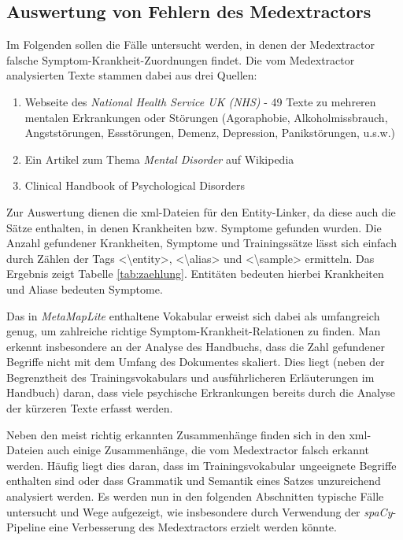 \subsection{Auswertung von Fehlern des Medextractors}
\label{subsec:detaillierteAuswertung} 

Im Folgenden sollen die Fälle untersucht werden, in denen der Medextractor falsche Symptom-Krankheit-Zuordnungen findet. Die vom Medextractor analysierten Texte stammen dabei aus drei Quellen:

\begin{enumerate}
	\item Webseite des \emph{National Health Service UK (NHS)} - 49 Texte zu mehreren mentalen Erkrankungen oder Störungen (Agoraphobie, Alkoholmissbrauch, Angststörungen, Essstörungen, Demenz, Depression, Panikstörungen, u.s.w.) \cite{nhs_webpage}
	\item Ein Artikel zum Thema \emph{Mental Disorder} auf Wikipedia \cite{wikimentaldisorder}
	\item Clinical Handbook of Psychological Disorders \cite{clinicalhandbook}
\end{enumerate}

Zur Auswertung dienen die xml-Dateien für den Entity-Linker, da diese auch die Sätze enthalten, in denen Krankheiten bzw. Symptome gefunden wurden. Die Anzahl gefundener Krankheiten, Symptome und Trainingssätze lässt sich einfach durch Zählen der Tags <\textbackslash entity>, <\textbackslash alias> und <\textbackslash sample> ermitteln. Das Ergebnis zeigt Tabelle \ref{tab:zaehlung}. Entitäten bedeuten hierbei Krankheiten und Aliase bedeuten Symptome.

Das in \emph{MetaMapLite} enthaltene Vokabular erweist sich dabei als umfangreich genug, um zahlreiche richtige Symptom-Krankheit-Relationen zu finden. Man erkennt insbesondere an der Analyse des Handbuchs, dass die Zahl gefundener Begriffe nicht mit dem Umfang des Dokumentes skaliert. Dies liegt (neben der Begrenztheit des Trainingsvokabulars und ausführlicheren Erläuterungen im Handbuch) daran, dass viele psychische Erkrankungen bereits durch die Analyse der kürzeren Texte erfasst werden.

Neben den meist richtig erkannten Zusammenhänge finden sich in den xml-Dateien auch einige Zusammenhänge, die vom Medextractor falsch erkannt werden. Häufig liegt dies daran, dass im Trainingsvokabular ungeeignete Begriffe enthalten sind oder dass Grammatik und Semantik eines Satzes unzureichend analysiert werden. Es werden nun in den folgenden Abschnitten typische Fälle untersucht und Wege aufgezeigt, wie insbesondere durch Verwendung der \emph{spaCy}-Pipeline eine Verbesserung des Medextractors erzielt werden könnte.

